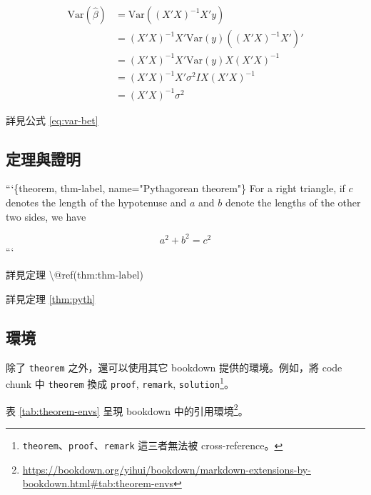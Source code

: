 \documentclass[oneside]{book}
\newenvironment{Shaded}{\begin{snugshade}}{\end{snugshade}}
\newcommand{\BaseNTok}[1]{\textcolor[rgb]{0.00,0.00,0.81}{#1}}
\newcommand{\NormalTok}[1]{#1}
\renewcommand{\href}[2]{#2\footnote{\url{#1}}}
\begin{document}
\begin{equation} 
\begin{split}
\mathrm{Var}(\hat{\beta}) & =\mathrm{Var}((X'X)^{-1}X'y)\\
 & =(X'X)^{-1}X'\mathrm{Var}(y)((X'X)^{-1}X')'\\
 & =(X'X)^{-1}X'\mathrm{Var}(y)X(X'X)^{-1}\\
 & =(X'X)^{-1}X'\sigma^{2}IX(X'X)^{-1}\\
 & =(X'X)^{-1}\sigma^{2}
\end{split}
\label{eq:var-bet}
\end{equation}

詳見公式 \eqref{eq:var-bet}

\hypertarget{theorem-proof}{%
\subsection{定理與證明}\label{theorem-proof}}

\begin{Shaded}
\begin{Highlighting}[]
\BaseNTok{```\{theorem, thm-label, name="Pythagorean theorem"\}}
\BaseNTok{For a right triangle, if $c$ denotes the length of the hypotenuse}
\BaseNTok{and $a$ and $b$ denote the lengths of the other two sides, we have}

\BaseNTok{$$a^2 + b^2 = c^2$$}
\BaseNTok{```}

\NormalTok{詳見定理 \textbackslash{}@ref(thm:thm-label)}
\end{Highlighting}
\end{Shaded}

詳見定理 \ref{thm:pyth}

\hypertarget{environment}{%
\subsection{環境}\label{environment}}

除了 \texttt{theorem} 之外，還可以使用其它 bookdown 提供的環境。例如，將 code chunk 中 \texttt{theorem} 換成 \texttt{proof}, \texttt{remark}, \texttt{solution}\footnote{\texttt{theorem}、\texttt{proof}、\texttt{remark} 這三者無法被 cross-reference。}。

表 \ref{tab:theorem-envs} 呈現 bookdown 中的\href{https://bookdown.org/yihui/bookdown/markdown-extensions-by-bookdown.html\#tab:theorem-envs}{引用環境}。
\end{document}
